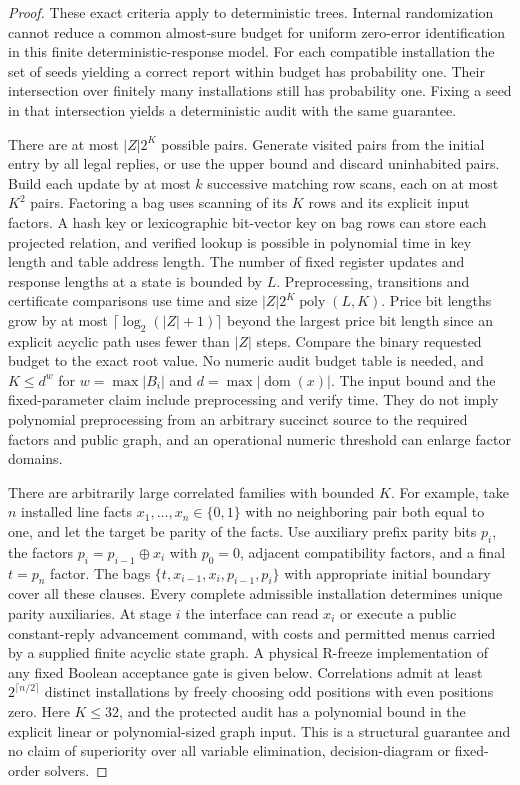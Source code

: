 \begin{proof}
These exact criteria apply to deterministic trees. Internal randomization cannot reduce a common almost-sure budget for uniform zero-error identification in this finite deterministic-response model. For each compatible installation the set of seeds yielding a correct report within budget has probability one. Their intersection over finitely many installations still has probability one. Fixing a seed in that intersection yields a deterministic audit with the same guarantee.

There are at most \(|Z|2^K\) possible pairs. Generate visited pairs from the initial entry by all legal replies, or use the upper bound and discard uninhabited pairs. Build each update by at most \(k\) successive matching row scans, each on at most \(K^2\) pairs. Factoring a bag uses scanning of its \(K\) rows and its explicit input factors. A hash key or lexicographic bit-vector key on bag rows can store each projected relation, and verified lookup is possible in polynomial time in key length and table address length. The number of fixed register updates and response lengths at a state is bounded by \(L\). Preprocessing, transitions and certificate comparisons use time and size \(|Z|2^K\operatorname{poly}(L,K)\). Price bit lengths grow by at most \(\lceil\log_2(|Z|+1)\rceil\) beyond the largest price bit length since an explicit acyclic path uses fewer than \(|Z|\) steps. Compare the binary requested budget to the exact root value. No numeric audit budget table is needed, and \(K\le d^w\) for \(w=\max |B_i|\) and \(d=\max|\operatorname{dom}(x)|\). The input bound and the fixed-parameter claim include preprocessing and verify time. They do not imply polynomial preprocessing from an arbitrary succinct source to the required factors and public graph, and an operational numeric threshold can enlarge factor domains.

There are arbitrarily large correlated families with bounded \(K\). For example, take \(n\) installed line facts \(x_1,\ldots,x_n\in\{0,1\}\) with no neighboring pair both equal to one, and let the target be parity of the facts. Use auxiliary prefix parity bits \(p_i\), the factors \(p_i=p_{i-1}\oplus x_i\) with \(p_0=0\), adjacent compatibility factors, and a final \(t=p_n\) factor. The bags \(\{t,x_{i-1},x_i,p_{i-1},p_i\}\) with appropriate initial boundary cover all these clauses. Every complete admissible installation determines unique parity auxiliaries. At stage \(i\) the interface can read \(x_i\) or execute a public constant-reply advancement command, with costs and permitted menus carried by a supplied finite acyclic state graph. A physical R-freeze implementation of any fixed Boolean acceptance gate is given below. Correlations admit at least \(2^{\lceil n/2\rceil}\) distinct installations by freely choosing odd positions with even positions zero. Here \(K\le 32\), and the protected audit has a polynomial bound in the explicit linear or polynomial-sized graph input. This is a structural guarantee and no claim of superiority over all variable elimination, decision-diagram or fixed-order solvers.


\end{proof}
